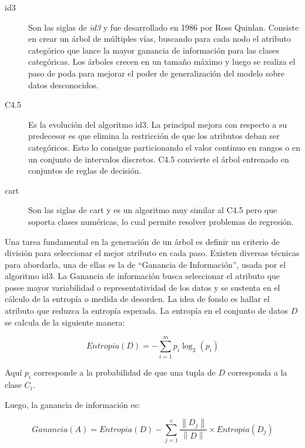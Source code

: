 \begin{description} 

   \item[\acrshort{id3}] Son las siglas de \textit{\acrlong{id3}} y fue
      desarrollado en 1986 por Ross Quinlan. Consiste en crear un árbol de
      múltiples vías, buscando para cada nodo el atributo categórico que lance
      la mayor ganancia de información para las clases categóricas. Los árboles
      crecen en un tamaño máximo y luego se realiza el paso de poda para mejorar
      el poder de generalización del modelo sobre datos desconocidos.

   \item[C4.5] Es la evolución del algoritmo \acrshort{id3}. La principal mejora
      con respecto a su predecesor es que elimina la restricción de que los
      atributos deban ser categóricos. Esto lo consigue particionando el valor
      continuo en rangos o en un conjunto de intervalos discretos. C4.5
      convierte el árbol entrenado en conjuntos de reglas de decisión. 

   \item[\acrshort{cart}] Son las siglas de \acrlong{cart} y es un algoritmo muy
      similar al C4.5 pero que soporta clases numéricas, lo cual permite
      resolver problemas de regresión. 

\end{description}

Una tarea fundamental en la generación de un árbol es definir un criterio de
división para seleccionar el mejor atributo en cada paso. Existen diversas
técnicas para abordarla, una de ellas es la de “Ganancia de Información”, usada
por el algoritmo \acrshort{id3}. La Ganancia de información busca seleccionar el
atributo que posee mayor variabilidad o representatividad de los datos y se
sustenta en el cálculo de la entropía o medida de desorden. La idea de fondo es
hallar el atributo que reduzca la entropía esperada. La entropía en el conjunto
de datos $D$ se calcula de la siguiente manera:

\begin{equation}
   Entropia(D) = - \sum_{i=1}^{m} p_{i}\log_{2}(p_{i})
\end{equation}

Aquí $p_{i}$ corresponde a la probabilidad de que una tupla de $D$ corresponda a
la clase $C_{i}$.  

Luego, la ganancia de información es:

\begin{equation}
   Ganancia(A) = Entropia(D) 
   - \sum_{j=1}^{v} \frac{\left\| D_{j} \right\|}{\left\| D \right\|} 
   \times Entropia(D_{j})
\end{equation}

